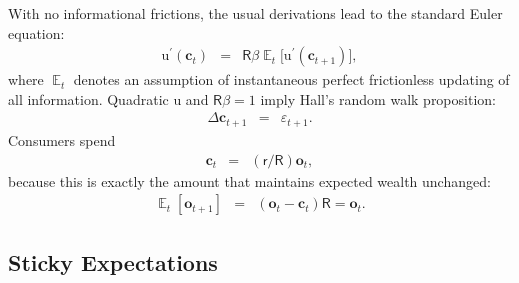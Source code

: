 \documentclass[titlepage]{article}
\DeclareMathOperator{\Ex}{\mathbb{E}} %
\begin{document}
With no informational frictions, the usual derivations lead to the standard Euler equation:
\begin{eqnarray*}
  {\mathrm{u}}^{\prime}(\mathbf{c}_{t}) & = & \mathsf{R}\beta \Ex_{t}\big[{\mathrm{u}}^{\prime}(\mathbf{c}_{t+1})\big], \label{eq:QuadEuler}
\end{eqnarray*}
 where $\Ex_{t}$ denotes an assumption of instantaneous perfect frictionless updating of all information. Quadratic ${\mathrm{u}}$ and $\mathsf{R} \beta=1$ imply Hall's random walk proposition:
\begin{eqnarray*}
  \Delta \mathbf{c}_{t+1} & = & \varepsilon_{t+1} \label{eq:dCQuad}.
\end{eqnarray*}
 Consumers spend
\begin{eqnarray*}
  \mathbf{c}_{t} & = & (\mathsf{r}/\mathsf{R}) \mathbf{o}_{t}, \label{eq:cquad}
\end{eqnarray*}
because this is exactly the amount that maintains expected wealth unchanged:
\begin{eqnarray*}
  \Ex_{t}[\mathbf{o}_{t+1}] & = & (\mathbf{o}_{t}-\mathbf{c}_{t})\mathsf{R} = \mathbf{o}_{t}
.
\end{eqnarray*}

\subsection{Sticky Expectations}
\end{document}
